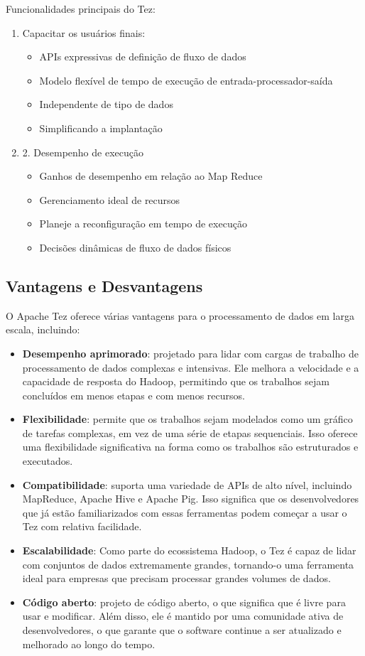 \documentclass[a4paper,11pt]{article}
\begin{document}
Funcionalidades principais do Tez: \vspace{-1em}
\begin{enumerate}
 \item Capacitar os usuários finais:
  \begin{itemize}
   \item APIs expressivas de definição de fluxo de dados
   \item Modelo flexível de tempo de execução de entrada-processador-saída
   \item Independente de tipo de dados
   \item Simplificando a implantação
  \end{itemize}
 \item 2. Desempenho de execução
  \begin{itemize}
   \item Ganhos de desempenho em relação ao Map Reduce
   \item Gerenciamento ideal de recursos
   \item Planeje a reconfiguração em tempo de execução
   \item Decisões dinâmicas de fluxo de dados físicos
  \end{itemize}
\end{enumerate}

\subsection{Vantagens e Desvantagens}
O Apache Tez oferece várias vantagens para o processamento de dados em larga escala, incluindo:
\begin{itemize}
 \item \textbf{Desempenho aprimorado}: projetado para lidar com cargas de trabalho de processamento de dados complexas e intensivas. Ele melhora a velocidade e a capacidade de resposta do Hadoop, permitindo que os trabalhos sejam concluídos em menos etapas e com menos recursos.
 \item \textbf{Flexibilidade}: permite que os trabalhos sejam modelados como um gráfico de tarefas complexas, em vez de uma série de etapas sequenciais. Isso oferece uma flexibilidade significativa na forma como os trabalhos são estruturados e executados.
 \item \textbf{Compatibilidade}: suporta uma variedade de APIs de alto nível, incluindo MapReduce, Apache Hive e Apache Pig. Isso significa que os desenvolvedores que já estão familiarizados com essas ferramentas podem começar a usar o Tez com relativa facilidade.
 \item \textbf{Escalabilidade}: Como parte do ecossistema Hadoop, o Tez é capaz de lidar com conjuntos de dados extremamente grandes, tornando-o uma ferramenta ideal para empresas que precisam processar grandes volumes de dados.
 \item \textbf{Código aberto}: projeto de código aberto, o que significa que é livre para usar e modificar. Além disso, ele é mantido por uma comunidade ativa de desenvolvedores, o que garante que o software continue a ser atualizado e melhorado ao longo do tempo.
\end{itemize}
\end{document}
